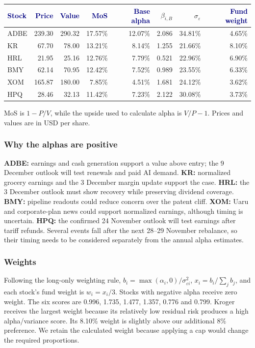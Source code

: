 \documentclass[10pt,a4paper]{article}
\newcommand{\hd}[1]{\textcolor{navy}{\textbf{#1}}}
\begin{document}
\begin{center}\small\setlength{\tabcolsep}{5pt}
\begin{tabular}{lrrrrrrr}\toprule
\hd{Stock}&\hd{Price}&\hd{Value}&\hd{MoS}&\hd{Base alpha}&$\beta_{i,B}$&$\sigma_\varepsilon$&\hd{Fund weight}\\\midrule
ADBE & 239.30 & 290.32 & 17.57\% & 12.07\% & 2.086 & 34.81\% & 4.65\% \\
KR & 67.70 & 78.00 & 13.21\% & 8.14\% & 1.255 & 21.66\% & 8.10\% \\
HRL & 21.95 & 25.16 & 12.76\% & 7.79\% & 0.521 & 22.96\% & 6.90\% \\
BMY & 62.14 & 70.95 & 12.42\% & 7.52\% & 0.989 & 23.55\% & 6.33\% \\
XOM & 165.87 & 180.00 & 7.85\% & 4.51\% & 1.681 & 24.12\% & 3.62\% \\
HPQ & 28.46 & 32.13 & 11.42\% & 7.23\% & 2.122 & 30.08\% & 3.73\% \\
\bottomrule\end{tabular}\end{center}
MoS is $1-P/V$, while the upside used to calculate alpha is $V/P-1$. Prices and values are in USD per share.

\subsubsection*{Why the alphas are positive}
\textbf{ADBE:} earnings and cash generation support a value above entry; the 9 December outlook will test renewals and paid AI demand. \textbf{KR:} normalized grocery earnings and the 3 December margin update support the case. \textbf{HRL:} the 3 December outlook must show recovery while preserving dividend coverage. \textbf{BMY:} pipeline readouts could reduce concern over the patent cliff. \textbf{XOM:} Uaru and corporate-plan news could support normalized earnings, although timing is uncertain. \textbf{HPQ:} the confirmed 24 November outlook will test earnings after tariff refunds. Several events fall after the next 28--29 November rebalance, so their timing needs to be considered separately from the annual alpha estimates.

\subsubsection*{Weights}
Following the long-only weighting rule, $b_i=\max(\alpha_i,0)/\sigma_{\varepsilon i}^{2}$, $x_i=b_i/\sum_j b_j$, and each stock's fund weight is $w_i=x_i/3$. Stocks with negative alpha receive zero weight. The six scores are 0.996, 1.735, 1.477, 1.357, 0.776 and 0.799. Kroger receives the largest weight because its relatively low residual risk produces a high alpha/variance score. Its 8.10\% weight is slightly above our additional 8\% preference. We retain the calculated weight because applying a cap would change the required proportions.
\end{document}

